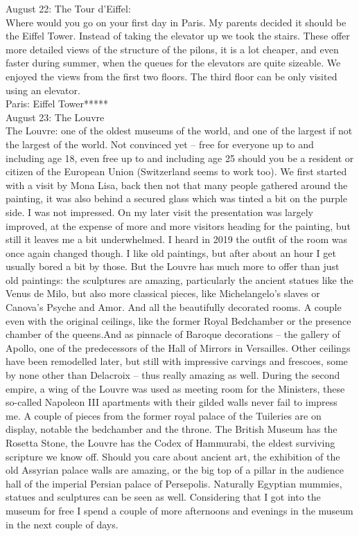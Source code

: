 August 22: The Tour d'Eiffel:\\
Where would you go on your first day in Paris. My parents decided it should be the Eiffel Tower. Instead of taking the elevator up we took the stairs. These offer more detailed views of the structure of the pilons, it is a lot cheaper, and even faster during summer, when the queues for the elevators are quite sizeable. We enjoyed the views from the first two floors. The third floor can be only visited using an elevator.\\

Paris: Eiffel Tower*****\\

August 23: The Louvre\\
The Louvre: one of the oldest museums of the world, and one of the largest if not the largest of the world. Not convinced yet -- free for everyone up to and including age 18, even free up to and including age 25 should you be a resident or citizen of the European Union (Switzerland seems to work too). We first started with a visit by Mona Lisa, back then not that many people gathered around the painting, it was also behind a secured glass which was tinted a bit on the purple side. I was not impressed. On my later visit the presentation was largely improved, at the expense of more and more visitors heading for the painting, but still it leaves me a bit underwhelmed. I heard in 2019 the outfit of the room was once again changed though. I like old paintings, but after about an hour I get usually bored a bit by those. But the Louvre has much more to offer than just old paintings: the sculptures are amazing, particularly the ancient statues like the Venus de Milo, but also more classical pieces, like Michelangelo's slaves or Canova's Psyche and Amor. And all the beautifully decorated rooms. A couple even with the original ceilings, like the former Royal Bedchamber or the presence chamber of the queens.And as pinnacle of Baroque decorations -- the gallery of Apollo, one of the predecessors of the Hall of Mirrors in Versailles. Other ceilings have been remodelled later, but still with impressive carvings and frescoes, some by none other than Delacroix -- thus really amazing as well. During the second empire, a wing of the Louvre was used as meeting room for the Ministers, these so-called Napoleon III apartments with their gilded walls never fail to impress me. A couple of pieces from the former royal palace of the Tuileries are on display, notable the bedchamber and the throne. The British Museum has the Rosetta Stone, the Louvre has the Codex of Hammurabi, the eldest surviving scripture we know off. Should you care about ancient art, the exhibition of the old Assyrian palace walls are amazing, or the big top of a pillar in the audience hall of the imperial Persian palace of Persepolis. Naturally Egyptian mummies, statues and sculptures can be seen as well. Considering that I got into the museum for free I spend a couple of more afternoons and evenings in the museum in the next couple of days.\\

